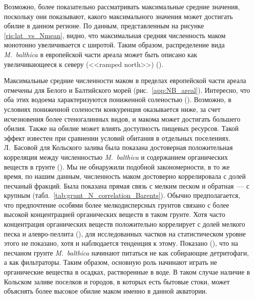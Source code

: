 Возможно, более показательно рассматривать максимальные средние значения, поскольку они показывают, какого максимального значения может достигать обилие в данном регионе.
По данным, представленным на рисунке \ref{ris:lat_vs_Nmean}, видно, что максимальная средняя численность маком монотонно увеличивается с широтой.
Таким образом, распределение вида {\it M.~balthica} в европейской части ареала может быть описано как увеличивающееся к северу (<<ramped north>>) (\cite{Sagarin_Gaines_2002}).

Максимальные средние численности маком в пределах европейской части ареала отмечены для Белого и Балтийского морей (рис.~\ref{app:NB_areal}).
Интересно, что оба этих водоема характеризуются пониженной соленостью (\cite{Dobrovolskiy_Zalogin_1982}).
Возможно, в условиях пониженной солености конкуренция оказывается ниже, за счет исчезновения более стеногалинных видов, и макома может достигать большего обилия.
Также на обилие может влиять доступность пищевых ресурсов. 
Такой эффект известен при сравнении условий обитания в отдельных поселениях.
Л.~Басовой для Кольского залива была показана достоверная положительная корреляция между численностью {\it M.~balthica} и содержанием органических веществ в грунте (\cite{Basova_2004}).   
Мы не обнаружили подобной закономерности, в то же время, по нашим данным, численность маком достоверно коррелировала с долей песчаный фракций. 
Была показана прямая связь с мелким песком и обратная~--- с крупным (табл.~\ref{tab:grunt_N_correlation_Barents}).
Обычно предполагается, что предпочтение особями более мелкодисперсных грунтов связано с более высокой концентрацией органических веществ в таком грунте. 
Хотя часто концентрация органических веществ положительно коррелирует с долей мелкого песка и алевро-пеллита (\cite{Bubnova_1972, Basova_2004}), для исследованных частков на статистическом уровне этого не показано, хотя и наблюдается тенденция к этому. 
Показано (\cite{Olafsson_1989}), что на песчаном грунте {\it M.~balthica} начинают питаться не как собирающие детритофаги, а как фильтраторы. 
Таким образом, основную роль начинают играть не органические вещества в осадках, растворенные в воде. 
В таком случае наличие в Кольском заливе поселков и городов, в которых есть бытовые стоки, может объяснять более высокое обилие маком именно в данной акватории.


\afterpage{\clearpage}

